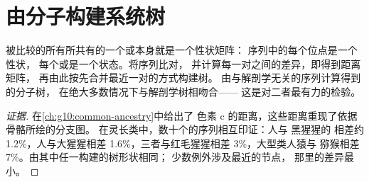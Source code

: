 \section{由分子构建系统树}

\begin{proposition}[分子系统发生]\label{prop:g12:phylogenetic-trees:molecular}
被比较的所有所共有的一个或本身就是一个性状矩阵：
序列中的每个位点是一个性状，
每个或是一个状态。将序列比对，
并计算每一对之间的差异，即得到距离矩阵，
再由此按先合并最近一对的方式构建树。
由与解剖学无关的序列计算得到的分子树，
在绝大多数情况下与解剖学树相吻合——
这是对二者最有力的检验。
\end{proposition}
\begin{proof}[证据]
在\cref{ch:g10:common-ancestry}中给出了
色素 c 的距离，这些距离重现了依据骨骼所绘的分支图。
在灵长类中，数十个的序列相互印证：人与
黑猩猩的  相差约 1.2\%，人与大猩猩相差
1.6\%，三者与红毛猩猩相差 3\%，大型类人猿与
猕猴相差 7\%。由其中任一构建的树形状相同；
少数例外涉及最近的节点，
那里的差异最小。
\end{proof}

